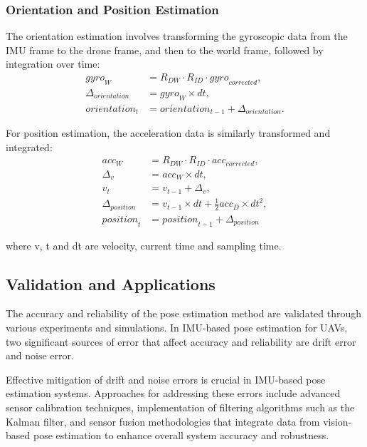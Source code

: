\subsubsection{Orientation and Position Estimation}
The orientation estimation involves transforming the gyroscopic data from the IMU frame to the drone frame, and then to the world frame, followed by integration over time:
\begin{align}
    {gyro}_{W} &= {R}_{DW} \cdot {R}_{ID} \cdot {gyro}_{corrected}, \\
    {\Delta}_{orientation} &= {gyro}_{W} \times dt, \\
    {orientation}_{t} &= {orientation}_{t-1} + {\Delta}_{orientation}.
\end{align}

For position estimation, the acceleration data is similarly transformed and integrated:
\begin{align}
    {acc}_{W} &= {R}_{DW} \cdot {R}_{ID} \cdot {acc}_{corrected}, \\
    {\Delta}_{v} &= {acc}_{W} \times dt, \\
    {v}_{t} &= {v}_{t-1} + {\Delta}_{v}, \\
    {\Delta}_{position} &= {v}_{t-1} \times dt + \frac{1}{2} {acc}_{D} \times dt^2, \\
    {position}_{t} &= {position}_{t-1} + {\Delta}_{position}
\end{align}

where v, t and dt are velocity, current time and sampling time.
\subsection{Validation and Applications}
The accuracy and reliability of the pose estimation method are validated through various experiments and simulations. In IMU-based pose estimation for UAVs, two significant sources of error that affect accuracy and reliability are drift error and noise error\cite{imu_drift}.

Effective mitigation of drift and noise errors is crucial in IMU-based pose estimation systems. Approaches for addressing these errors include advanced sensor calibration techniques, implementation of filtering algorithms such as the Kalman filter, and sensor fusion methodologies that integrate data from vision-based pose estimation to enhance overall system accuracy and robustness.


